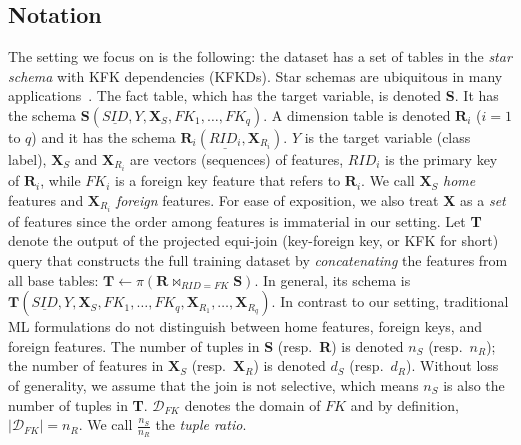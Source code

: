 \documentclass{vldb}
\newcommand{\eat}[1]{}
\begin{document}
\subsection{Notation}
The setting we focus on is the following: the dataset has a set of tables in the \textit{star schema} with KFK dependencies (KFKDs).
Star schemas are ubiquitous in many applications~\cite{cowbook}.
The fact table, which has the target variable, is denoted \textbf{S}. It has the schema $\textbf{S}(\underline{SID},Y, \textbf{X}_S, FK_1, \dots, FK_q)$.
A dimension table is denoted $\textbf{R}_i$ ($i = 1$ to $q$) and it has the schema $\textbf{R}_i(\underline{RID_i},\textbf{X}_{R_i})$.
$Y$ is the target variable (class label), $\textbf{X}_S$ and $\textbf{X}_{R_i}$ are vectors (sequences) of features, $RID_i$ is the primary key
of $\textbf{R}_i$, while $FK_i$ is a foreign key feature that refers to $\textbf{R}_i$. We call $\textbf{X}_S$ \textit{home} features and $\textbf{X}_{R_i}$ \textit{foreign} features.
For ease of exposition, we also treat \textbf{X} as a \textit{set} of features since the order among features is immaterial in our setting.
Let \textbf{T} denote the output of the projected equi-join (key-foreign key, or KFK for short) query that constructs the full training dataset by 
\textit{concatenating} the features from all base tables: $\textbf{T} \leftarrow \pi(\textbf{R} \bowtie_{RID=FK} \textbf{S})$. In general, its schema is 
$\textbf{T}(\underline{SID},Y,\textbf{X}_S,FK_1,\dots,FK_q,\textbf{X}_{R_1},\dots,\textbf{X}_{R_q})$. In contrast to our setting, traditional ML 
formulations do not distinguish between home features, foreign keys, and foreign features. The number of tuples in \textbf{S} (resp.~\textbf{R}) is 
denoted $n_S$ (resp.~$n_R$); the number of features in $\textbf{X}_S$ (resp.~$\textbf{X}_R$) is denoted $d_S$ (resp.~$d_R$). Without loss of generality, we
assume that the join is not selective, which means $n_S$ is also the number of tuples in \textbf{T}. $\mathcal{D}_{FK}$ denotes the domain of $FK$ 
and by definition, $|\mathcal{D}_{FK}| = n_R$. We call $\frac{n_S}{n_R}$ the \textit{tuple ratio}.
\eat{\footnote{Note that this setting is 
different from the statistical relational learning (SRL) setting in which the joins could violate the IID assumption because they are not KFK (labeled examples in \textbf{S}
might get duplicated. KFK joins do not cause such repetitions.}}
\end{document}
